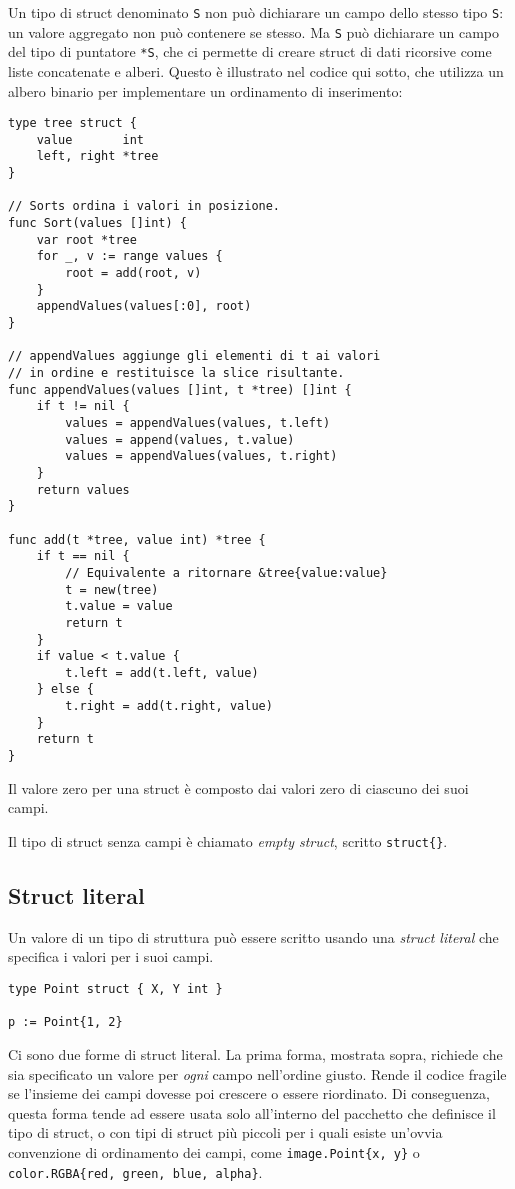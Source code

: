 Un tipo di struct denominato \verb|S| non può dichiarare un campo dello stesso tipo \verb|S|: un valore aggregato non può contenere se stesso.
Ma \verb|S| può dichiarare un campo del tipo di puntatore \verb|*S|, che ci permette di creare struct di dati ricorsive come liste concatenate e alberi.
Questo è illustrato nel codice qui sotto, che utilizza un albero binario per implementare un ordinamento di inserimento:
\begin{lstlisting}[frame=single, label={lst:lstlisting3-4.7}]
type tree struct {
    value       int
    left, right *tree
}

// Sorts ordina i valori in posizione.
func Sort(values []int) {
    var root *tree
    for _, v := range values {
        root = add(root, v)
    }
    appendValues(values[:0], root)
}

// appendValues aggiunge gli elementi di t ai valori
// in ordine e restituisce la slice risultante.
func appendValues(values []int, t *tree) []int {
    if t != nil {
        values = appendValues(values, t.left)
        values = append(values, t.value)
        values = appendValues(values, t.right)
    }
    return values
}

func add(t *tree, value int) *tree {
    if t == nil {
        // Equivalente a ritornare &tree{value:value}
        t = new(tree)
        t.value = value
        return t
    }
    if value < t.value {
        t.left = add(t.left, value)
    } else {
        t.right = add(t.right, value)
    }
    return t
}
\end{lstlisting}
Il valore zero per una struct è composto dai valori zero di ciascuno dei suoi campi.

Il tipo di struct senza campi è chiamato \textit{empty struct}, scritto \verb|struct{}|.

\subsection{Struct literal}
\label{subsec:struct_literal}%
Un valore di un tipo di struttura può essere scritto usando una \textit{struct literal} che specifica i valori per i suoi campi.
\begin{lstlisting}[frame=single, label={lst:lstlisting3-4-1.1}]
type Point struct { X, Y int }

p := Point{1, 2}
\end{lstlisting}
Ci sono due forme di struct literal.
La prima forma, mostrata sopra, richiede che sia specificato un valore per \textit{ogni} campo nell'ordine giusto.
Rende il codice fragile se l'insieme dei campi dovesse poi crescere o essere riordinato.
Di conseguenza, questa forma tende ad essere usata solo all'interno del pacchetto che definisce il tipo di struct, o con tipi di struct più piccoli per i quali esiste un'ovvia convenzione di ordinamento dei campi, come \verb|image.Point{x, y}| o \verb|color.RGBA{red, green, blue, alpha}|.

